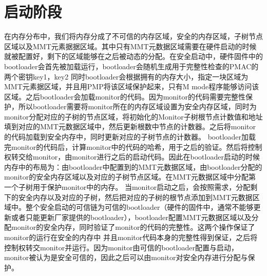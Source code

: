 \section{启动阶段}
在内存分布中，我们将内存分成了不可信的内存区域，安全的内存区域，子树节点区域以及MMT元素据据区域。其中只有MMT元数据区域需要在硬件启动的时候就被配置好，剩下的区域能够在之后被动态的分配。在安全启动中，硬件固件中的bootloader会首先被加载运行，bootloader会随机生成用于完整性检查的PMAC的两个密钥key1，key2
同时bootloader会根据拥有的内存大小，指定一块区域为MMT元素据区域，并且用PMP将该区域保护起来，只有M mode程序能够访问该区域。之后bootloader会加载monitor的代码。因为monitor的代码需要完整性保护，所以bootloader需要将monitor所在的内存区域设置为安全内存区域，同时为monitor分配对应的子树的节点区域，将初始化的Monitor子树根节点计数值和地址填到对应的MMT元数据区域中，然后更新根数中节点的计数器。之后将monitor的代码加载到安全内存中，同时更新对应的子树节点的计数器。
bootloader加载完monitor的代码后，计算monitor中的代码的哈希，用于之后的验证。然后将控制权转交给monitor，由monitor进行之后的启动代码。因此在bootloader启动的时候内存中的布局为：由bootloader中配置到的MMT元数据区域，由bootloader分配的monitor的安全内存区域以及对应的子树节点区域。在MMT元数据区域中分配第一个子树用于保护monitor中的内存。
当monitor启动之后，会按照需求，分配剩下的安全内存以及对应的子树，然后把对应的子树的根节点添加到MMT元数据区域中。整个安全启动的可信链为可信的bootloader（硬件的固件中，通常不能够更新或者只能更新厂家提供的bootloader），bootloader配置MMT元数据区域以及分配monitor的安全内存，同时验证了monitor的代码的完整性。这两个操作保证了monitor的运行在安全的内存中
并且monitor代码本身的完整性得到保证，之后将控制权转交monitor并运行。因为monitor由可信的bootloader配置与启动，monitor被认为是安全可信的，因此之后可以由monitor对安全内存进行分配与保护。

